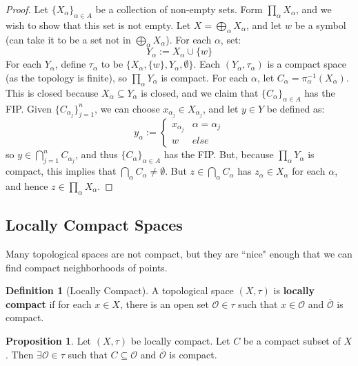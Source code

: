 \documentclass[11pt, oneside]{amsart}   	%
\theoremstyle{definition}
\newtheorem{definition}{Definition}[section]
\newtheorem{prop}{Proposition}[section]
\begin{document}
	\begin{proof}
		Let $\{X_\alpha\}_{\alpha\in A}$ be a collection of non-empty sets. Form $\prod_\alpha X_\alpha$, and we wish to 
		show that this set is not empty. Let $X = \bigoplus_\alpha X_\alpha$, and let $w$ be a symbol (can take it to 
		be a set not in $\bigoplus_\alpha X_\alpha$). For each $\alpha$, set:
		$$
			Y_\alpha := X_\alpha\cup\{w\}
		$$
		For each $Y_\alpha$, define $\tau_\alpha$ to be $\{X_\alpha, \{w\}, Y_\alpha, \emptyset\}$. Each $(Y_\alpha, 
		\tau_\alpha)$ is a compact space (as the topology is finite), so $\prod_\alpha Y_\alpha$ is compact. For each 
		$\alpha$, let $C_\alpha = \pi_\alpha^{-1}(X_\alpha)$. This is closed because $X_\alpha\subseteq Y_\alpha$ is 
		closed, and we claim that $\{C_\alpha\}_{\alpha\in A}$ has the FIP. Given $\{C_{\alpha_j}\}_{j = 1}^n$, we can 
		choose $x_{\alpha_j}\in X_{\alpha_j}$, and let $y\in Y$ be defined as:
		$$
			y_\alpha := \begin{cases}
				x_{\alpha_j} & \alpha = \alpha_j \\
				w & else
			\end{cases}
		$$
		so $y\in \bigcap_{j = 1}^n C_{\alpha_j}$, and thus $\{C_\alpha\}_{\alpha\in A}$ has the FIP. But, because 
		$\prod_\alpha Y_\alpha$ is compact, this implies that $\bigcap_\alpha C_\alpha\neq\emptyset$. But $z\in 
		\bigcap_\alpha C_\alpha$ has $z_\alpha\in X_\alpha$ for each $\alpha$, and hence $z\in\prod_\alpha X_\alpha$.
	\end{proof}
	
\subsection{Locally Compact Spaces}

	Many topological spaces are not compact, but they are ``nice" enough that we can find compact neighborhoods of 
	points. 
	
	\begin{definition}[Locally Compact]
		A topological space $(X, \tau)$ is \textbf{locally compact} if for each $x\in X$, there is an open set $\mathcal O
		\in\tau$ such that $x\in\mathcal O$ and $\overline{\mathcal O}$ is compact.
	\end{definition}
	
	\begin{prop}
		Let $(X, \tau)$ be locally compact. Let $C$ be a compact subset of $X$. Then $\exists\mathcal O\in\tau$ such 
		that $C\subseteq\mathcal O$ and $\overline{\mathcal O}$ is compact.
	\end{prop}
	
\end{document}
